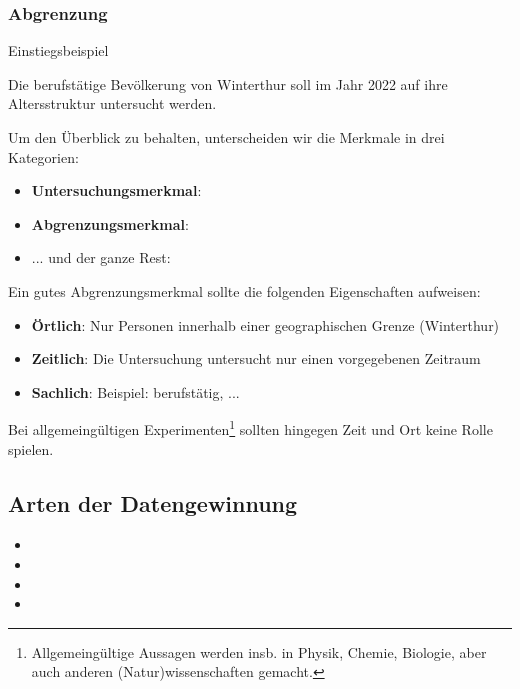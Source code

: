 \subsubsection{Abgrenzung}
Einstiegsbeispiel


Die berufstätige Bevölkerung von Winterthur soll im Jahr 2022 auf ihre
Altersstruktur untersucht werden.



\newpage
Um den Überblick zu behalten, unterscheiden wir die Merkmale in drei
Kategorien:
\begin{itemize}
\item \textbf{Untersuchungsmerkmal}:
\item \textbf{Abgrenzungsmerkmal}:
\item ... und der ganze Rest: 

\end{itemize}

Ein gutes Abgrenzungsmerkmal sollte die folgenden Eigenschaften
aufweisen:
\begin{itemize}
\item \textbf{Örtlich}: Nur Personen innerhalb einer geographischen
  Grenze (\zB Winterthur)
\item \textbf{Zeitlich}: Die Untersuchung untersucht nur einen vorgegebenen
Zeitraum
\item \textbf{Sachlich}: Beispiel: berufstätig, ...
\end{itemize}

Bei allgemeingültigen Experimenten\footnote{Allgemeingültige Aussagen
  werden insb. in Physik, Chemie, Biologie, aber auch anderen
  (Natur)wissenschaften gemacht.} sollten hingegen Zeit und Ort keine Rolle spielen.
\newpage

\subsection{Arten der Datengewinnung}
\begin{itemize}
 \item {}
 \item {}
 \item {}
 \item {}
\end{itemize}

